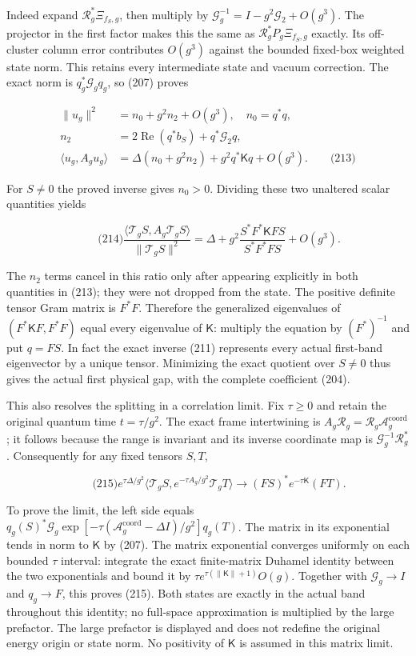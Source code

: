 Indeed expand \(\mathcal R_g^*\Xi_{f_S,g}\), then multiply by
\(\mathcal G_g^{-1}=I-g^2\mathcal G_2+O(g^3)\). The projector in the
first factor makes this the same as \(\mathcal R_g^*P_g\Xi_{f_S,g}\)
exactly. Its off-cluster column error contributes \(O(g^3)\) against the
bounded fixed-box weighted state norm. This retains every intermediate
state and vacuum correction. The exact norm is \(q_g^*\mathcal G_gq_g\),
so (207) proves

\[
\begin{aligned}
 \|u_g\|^2&=n_0+g^2n_2+O(g^3),\quad n_0=q^*q,\\
 n_2&=2\operatorname{Re}(q^*b_S)+q^*\mathcal G_2q,\\
 \langle u_g,A_gu_g\rangle
       &=\Delta(n_0+g^2n_2)+g^2q^*\mathsf Kq+O(g^3).
 \qquad\text{(213)}
\end{aligned}
\]

For \(S\ne0\) the proved inverse gives \(n_0>0\). Dividing these two
unaltered scalar quantities yields

\[
\qquad\text{(214)}
 \frac{\langle\mathcal T_gS,A_g\mathcal T_gS\rangle}
      {\|\mathcal T_gS\|^2}
 =\Delta+g^2\frac{S^*F^*\mathsf KFS}{S^*F^*FS}+O(g^3).
\]

The \(n_2\) terms cancel in this ratio only after appearing explicitly
in both quantities in (213); they were not dropped from the state. The
positive definite tensor Gram matrix is \(F^*F\). Therefore the
generalized eigenvalues of \((F^*\mathsf KF,F^*F)\) equal every
eigenvalue of \(\mathsf K\): multiply the equation by \((F^*)^{-1}\) and
put \(q=FS\). In fact the exact inverse (211) represents every actual
first-band eigenvector by a unique tensor. Minimizing the exact quotient
over \(S\ne0\) thus gives the actual first physical gap, with the
complete coefficient (204).

This also resolves the splitting in a correlation limit. Fix
\(\tau\ge0\) and retain the original quantum time \(t=\tau/g^2\). The
exact frame intertwining is
\(A_g\mathcal R_g=\mathcal R_g\mathcal A_g^{\mathrm{coord}}\); it
follows because the range is invariant and its inverse coordinate map is
\(\mathcal G_g^{-1}\mathcal R_g^*\). Consequently for any fixed tensors
\(S,T\),

\[
\qquad\text{(215)}
 e^{\tau\Delta/g^2}
 \langle\mathcal T_gS,e^{-\tau A_g/g^2}\mathcal T_gT\rangle
 \longrightarrow (FS)^*e^{-\tau\mathsf K}(FT).
\]

To prove the limit, the left side equals \(q_g(S)^*\mathcal G_g
 \exp[-\tau(\mathcal A_g^{\mathrm{coord}}-\Delta I)/g^2]q_g(T)\). The
matrix in its exponential tends in norm to \(\mathsf K\) by (207). The
matrix exponential converges uniformly on each bounded \(\tau\)
interval: integrate the exact finite-matrix Duhamel identity between the
two exponentials and bound it by \(\tau e^{\tau(\|\mathsf K\|+1)}O(g)\).
Together with \(\mathcal G_g\to I\) and \(q_g\to F\), this proves (215).
Both states are exactly in the actual band throughout this identity; no
full-space approximation is multiplied by the large prefactor. The large
prefactor is displayed and does not redefine the original energy origin
or state norm. No positivity of \(\mathsf K\) is assumed in this matrix
limit.

